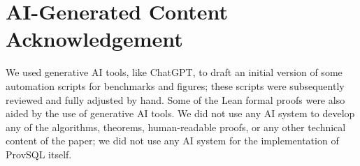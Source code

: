 \section*{AI-Generated Content Acknowledgement}
We used generative AI tools, like ChatGPT, to draft an initial version
of some automation scripts for benchmarks and figures; these scripts were subsequently reviewed
and fully adjusted by hand. Some of the Lean formal proofs were also aided by
the use of generative AI tools. We did not use any AI system to develop any of the
algorithms, theorems, human-readable proofs, or any other
technical content of the paper; we did not use any AI system for the
implementation of ProvSQL itself.
